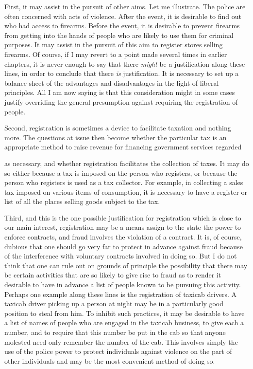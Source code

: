 \documentclass[11pt,openany]{book}
\begin{document}
First, it may assist in the pursuit of other aims. Let me illustrate. The police are often concerned with acts of violence. After the event, it is desirable to find out who had access to firearms. Before the event, it is desirable to prevent firearms from getting into the hands of people who are likely to use them for criminal purposes. It may assist in the pursuit of this aim to register stores selling firearms. Of course, if I may revert to a point made several times in earlier chapters, it is never enough to say that there \emph{might} be a justification along these lines, in order to conclude that there \emph{is} justification. It is necessary to set up a balance sheet of the advantages and disadvantages in the light of liberal principles. All I am now saying is that this consideration might in some cases justify overriding the general presumption against requiring the registration of people.

Second, registration is sometimes a device to facilitate taxation and nothing more. The questions at issue then become whether the particular tax is an appropriate method to raise revenue for financing government services regarded

as necessary, and whether registration facilitates the collection of taxes. It may do so either because a tax is imposed on the person who registers, or because the person who registers is used as a tax collector. For example, in collecting a sales tax imposed on various items of consumption, it is necessary to have a register or list of all the places selling goods subject to the tax.

Third, and this is the one possible justification for registration which is close to our main interest, registration may be a means assign to the state the power to enforce contracts, and fraud involves the violation of a contract. It is, of course, dubious that one should go very far to protect in advance against fraud because of the interference with voluntary contracts involved in doing so. But I do not think that one can rule out on grounds of principle the possibility that there may be certain activities that are so likely to give rise to fraud as to render it desirable to have in advance a list of people known to be pursuing this activity. Perhaps one example along these lines is the registration of taxicab drivers. A taxicab driver picking up a person at night may be in a particularly good position to steal from him. To inhibit such practices, it may be desirable to have a list of names of people who are engaged in the taxicab business, to give each a number, and to require that this number be put in the cab so that anyone molested need only remember the number of the cab. This involves simply the use of the police power to protect individuals against violence on the part of other individuals and may be the most convenient method of doing so.
\end{document}
